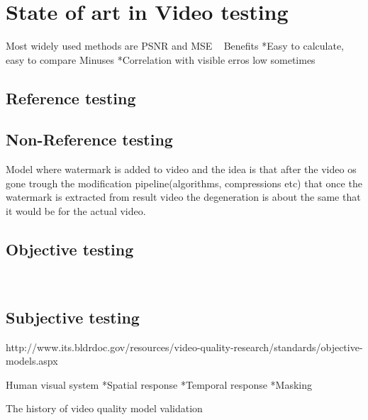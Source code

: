 
\section{State of art in Video testing}

Most widely used methods are PSNR and MSE ~\cite{4347144}
Benefits
*Easy to calculate, easy to compare
Minuses
*Correlation with visible erros low sometimes
\subsection{Reference testing}

\subsection{Non-Reference testing}

Model where watermark is added to video and the idea is that after the video
os gone trough the modification pipeline(algorithms, compressions etc) that
once the watermark is extracted from result video the degeneration is about
the same that it would be for the actual video. ~\cite{1203346}



\subsection{Objective testing}

~\cite{4347144}

\subsection{Subjective testing}
http://www.its.bldrdoc.gov/resources/video-quality-research/standards/objective-models.aspx

Human visual system
*Spatial response
*Temporal response
*Masking
~\cite{4347144}

The history of video quality model validation ~\cite{6659332}
